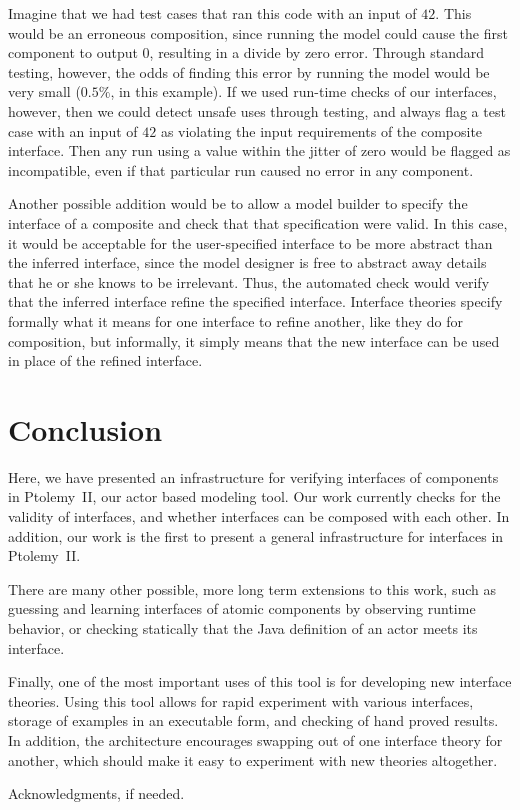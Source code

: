 \documentclass[preprint,11pt]{sigplanconf}
\begin{document}
Imagine that we had test cases that ran this code with an input of $42$.
This would be an erroneous composition, since running the model could cause
the first component to output $0$, resulting in a divide by zero error.
Through standard testing, however, the odds of finding this error by running
the model would be very small ($0.5\%$, in this example). If we used run-time
checks of our interfaces, however, then we could detect unsafe uses through
testing, and always flag a test case with an input of $42$ as violating the
input requirements of the composite interface. Then any run using a value
within the jitter of zero would be flagged as incompatible, even if that
particular run caused no error in any component.

Another possible addition would be to allow a model builder to specify the
interface of a composite and check that that specification were valid.
In this case, it would be acceptable for the user-specified interface to be
more abstract than the inferred interface, since the model designer is free to
abstract away details that he or she knows to be irrelevant. Thus, the
automated check would verify that the inferred interface refine the specified
interface. Interface theories specify formally what it means for one interface
to refine another, like they do for composition, but informally, it simply
means that the new interface can be used in place of the refined interface.

\section{Conclusion}
Here, we have presented an infrastructure for verifying interfaces of
components in Ptolemy~II, our actor based modeling tool. Our work currently
checks for the validity of interfaces, and whether interfaces can be composed
with each other. In addition, our work is the first to present a general
infrastructure for interfaces in Ptolemy~II.


There are many other possible, more long term extensions to this work, such as
guessing and learning interfaces of atomic components by observing runtime
behavior, or checking statically that the Java definition of an actor meets
its interface.

Finally, one of the most important uses of this tool is for developing new
interface theories. Using this tool allows for rapid experiment with various
interfaces, storage of examples in an executable form, and checking of hand
proved results. In addition, the architecture encourages swapping out of one
interface theory for another, which should make it easy to experiment with new
theories altogether.

\acks

Acknowledgments, if needed.




\end{document}
